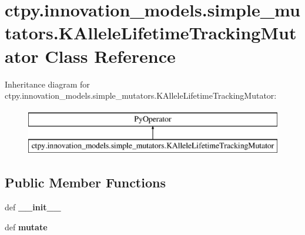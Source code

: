 \hypertarget{classctpy_1_1innovation__models_1_1simple__mutators_1_1_k_allele_lifetime_tracking_mutator}{\section{ctpy.\-innovation\-\_\-models.\-simple\-\_\-mutators.\-K\-Allele\-Lifetime\-Tracking\-Mutator Class Reference}
\label{classctpy_1_1innovation__models_1_1simple__mutators_1_1_k_allele_lifetime_tracking_mutator}
}
Inheritance diagram for ctpy.\-innovation\-\_\-models.\-simple\-\_\-mutators.\-K\-Allele\-Lifetime\-Tracking\-Mutator\-:\begin{figure}[H]
\begin{center}
\leavevmode
\includegraphics[height=2.000000cm]{classctpy_1_1innovation__models_1_1simple__mutators_1_1_k_allele_lifetime_tracking_mutator}
\end{center}
\end{figure}
\subsection*{Public Member Functions}
\begin{DoxyCompactItemize}
\item 
\hypertarget{classctpy_1_1innovation__models_1_1simple__mutators_1_1_k_allele_lifetime_tracking_mutator_a382c3c821858fcc554d4d97788f986c7}{def {\bfseries \-\_\-\-\_\-init\-\_\-\-\_\-}}\label{classctpy_1_1innovation__models_1_1simple__mutators_1_1_k_allele_lifetime_tracking_mutator_a382c3c821858fcc554d4d97788f986c7}

\item 
\hypertarget{classctpy_1_1innovation__models_1_1simple__mutators_1_1_k_allele_lifetime_tracking_mutator_a08c1d80f4c8dbbda11b7a989cde703af}{def {\bfseries mutate}}\label{classctpy_1_1innovation__models_1_1simple__mutators_1_1_k_allele_lifetime_tracking_mutator_a08c1d80f4c8dbbda11b7a989cde703af}

\end{DoxyCompactItemize}
